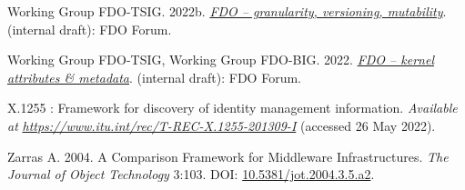 \begin{CSLReferences}{1}{0}
\leavevmode{}%
Working Group FDO-TSIG. 2022b. \emph{\href{https://docs.google.com/document/d/1VJTYHxLXIbjHSoFnMEkKaTbpTz9CagoIJyoSafkVh_I/edit}{FDO -- granularity, versioning, mutability}}. (internal draft): FDO Forum.

\leavevmode{}%
Working Group FDO-TSIG, Working Group FDO-BIG. 2022. \emph{\href{https://docs.google.com/document/d/11CuSoNOpg3vYaoHqi4Yg6ncP3qOclJIC/edit}{FDO -- kernel attributes \& metadata}}. (internal draft): FDO Forum.

\leavevmode{}%
X.1255 : Framework for discovery of identity management information. \emph{Available at} \href{https://www.itu.int/rec/T-REC-X.1255-201309-I}{\emph{https://www.itu.int/rec/T-REC-X.1255-201309-I}} (accessed 26 May 2022).

\leavevmode{}%
Zarras A. 2004. A Comparison Framework for Middleware Infrastructures. \emph{The Journal of Object Technology} 3:103. DOI: \href{https://doi.org/10.5381/jot.2004.3.5.a2}{10.5381/jot.2004.3.5.a2}.

\end{CSLReferences}
